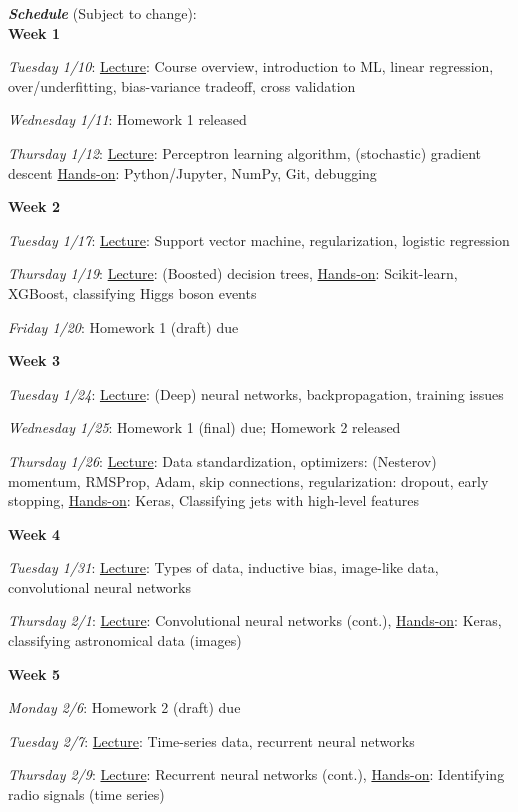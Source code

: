 \documentclass[12pt]{article}
\begin{document}
\noindent\textbf{\emph{Schedule}} (Subject to change):\\

\noindent\textbf{Week 1}

\emph{Tuesday 1/10}: \underline{Lecture}: Course overview, introduction to ML, linear regression, over/underfitting, bias-variance tradeoff, cross validation

\emph{Wednesday 1/11}: Homework 1 released

\emph{Thursday 1/12}: \underline{Lecture}: Perceptron learning algorithm, (stochastic) gradient descent \underline{Hands-on}: Python/Jupyter, NumPy, Git, debugging

\noindent\textbf{Week 2}

\emph{Tuesday 1/17}: \underline{Lecture}: Support vector machine, regularization, logistic regression

\emph{Thursday 1/19}: \underline{Lecture}: (Boosted) decision trees, \underline{Hands-on}: Scikit-learn, XGBoost, classifying Higgs boson events

\emph{Friday 1/20}: Homework 1 (draft) due

\noindent\textbf{Week 3}

\emph{Tuesday 1/24}: \underline{Lecture}: (Deep) neural networks, backpropagation, training issues

\emph{Wednesday 1/25}: Homework 1 (final) due; Homework 2 released

\emph{Thursday 1/26}: \underline{Lecture}: Data standardization, optimizers: (Nesterov) momentum, RMSProp, Adam, skip connections, regularization: dropout, early stopping, \underline{Hands-on}: Keras, Classifying jets with high-level features

\noindent\textbf{Week 4}

\emph{Tuesday 1/31}: \underline{Lecture}: Types of data, inductive bias, image-like data, convolutional neural networks

\emph{Thursday 2/1}: \underline{Lecture}: Convolutional neural networks (cont.), \underline{Hands-on}: Keras, classifying astronomical data (images)

\noindent\textbf{Week 5}

\emph{Monday 2/6}: Homework 2 (draft) due

\emph{Tuesday 2/7}: \underline{Lecture}: Time-series data, recurrent neural networks

\emph{Thursday 2/9}: \underline{Lecture}: Recurrent neural networks (cont.), \underline{Hands-on}: Identifying radio signals (time series)
\end{document}
